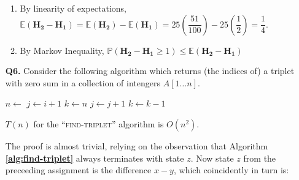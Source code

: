 \documentclass[10pt, letterpaper]{article}
\begin{document}
\begin{enumerate}
\begin{enumerate}
      \item
        By linearity of expectations, $\mathbb{E}(\bm{H_2} - \bm{H_1}) = \mathbb{E}(\bm{H_2})
        - \mathbb{E}(\bm{H_1}) = 25\left(\dfrac{51}{100} \right) - 25\left(\dfrac{1}{2}\right)
        = \dfrac{1}{4}.$ \\

      \item 
        By Markov Inequality, $\mathbb{P}(\bm{H_2} - \bm{H_1} \geq 1) \leq \mathbb{E}(\bm{H_2}
        - \bm{H_1})$
    \end{enumerate}

  \item[\textbf{Q6.}]
    Consider the following algorithm which returns (the indices of) a triplet with zero sum in
    a collection of intengers $A[1 \ldots n]$.
    \vspace{-6mm}
    \begin{center}
      \begin{minipage}{.99\linewidth}
        \begin{algorithm}[H]
          \caption{$\textsc{find-triplet}(A)$}\label{alg:find-triplet}
          \begin{algorithmic}
            \State $n \gets$ 
              \State {}
            \EndIf
            \State {}
              \State $j \gets i + 1$
              \State $k \gets n$
                  \State $j \gets j + 1$
                  \State $k \gets k - 1$
                \Else
                  \State {}
                \EndIf
              \EndWhile
            \EndFor
            \State {}
          \end{algorithmic}
        \end{algorithm}
      \end{minipage}
    \end{center}

    \begin{claim*}
      $T(n)$ for the ``\textsc{find-triplet}'' algorithm is $O(n^2)$.
    \end{claim*}

    \begin{proof*}
      The proof is almost trivial, relying on the observation that Algorithm \textbf{\ref{alg:find-triplet}}
      always terminates with state $z$. Now state $z$ from the preceeding assignment is the
      difference $x - y$, which coincidently in turn is:
    \end{proof*}
\end{enumerate}
\end{document}
